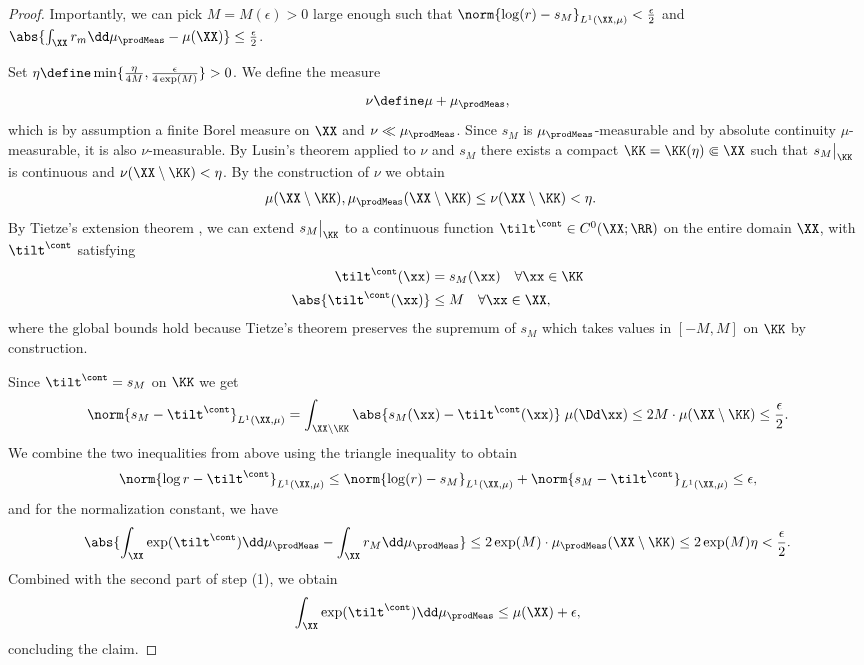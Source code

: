 \documentclass{article}
\begin{document}
\begin{proof}
 Importantly, we can pick $M = M(\epsilon) > 0$ large enough such that
 $\norm{\log(r) - s_{M}}_{L^1(\XX, \mu)} < \frac{\epsilon}{2}$ and
 $\abs{\int_{\XX} r_m \dd \mu_\prodMeas - \mu(\XX)} \leq
  \frac{\epsilon}{2}$.

 Set $\eta\define \min\{\frac{\eta}{4M}, \frac{\epsilon}{4\exp(M)}\} > 0$.
 We define the measure
 \begin{align*}
  \nu \define \mu + \mu_{\prodMeas},
 \end{align*}
 which is by assumption a finite Borel measure on $\XX$ and $\nu \ll \mu_\prodMeas$.
 Since $s_{M}$ is
 $\mu_\prodMeas$-measurable and by absolute continuity
 $\mu$-measurable, it is also $\nu$-measurable. By Lusin's theorem
 \cite[Thm. 1.14]{evansMeasureTheoryFine2015} applied to $\nu$ and $s_{M}$
 there exists a compact $\KK = \KK(\eta) \Subset \XX$ such that
 $s_{M}\big\vert_{\KK}$ is continuous
 and $\nu(\XX\setminus\KK) < \eta$. By the construction of
 $\nu$ we obtain
 \begin{align*}
  \mu(\XX\setminus\KK), \mu_\prodMeas(\XX\setminus\KK)
   & \leq \nu(\XX\setminus\KK)  < \eta.
 \end{align*}
 By Tietze's extension theorem
 \cite[Cor. 2]{mcshaneExtensionRangeFunctions1934}, we can extend
 $s_{ M}\big\vert_{\KK}$ to a continuous function $\tilt^\cont \in C^0(\XX;\RR)$
 on the entire domain $\XX$, with $\tilt^\cont$ satisfying
 \begin{align*}
  \tilt^\cont(\xx)       & = s_{ M}(\xx) \quad \forall \xx \in \KK \\
  \abs{\tilt^\cont(\xx)} & \leq M \quad \forall \xx \in \XX,
 \end{align*}
 where the global bounds hold because Tietze's theorem preserves the supremum of
 $s_{M}$ which takes values in $[-M, M]$ on $\KK$ by construction.


  Since $\tilt^\cont = s_{M}$ on $\KK$ we
 get
 \begin{align*}
  \norm{s_{ M} - \tilt^\cont}_{L^1(\XX, \mu)} =
  \int_{\XX\setminus\KK} \abs{s_M(\xx) - \tilt^\cont(\xx)} \; \mu(\Dd \xx)
  \leq 2M \cdot \mu(\XX\setminus \KK)
  \leq \frac{\epsilon}{2}.
 \end{align*}
 We combine the two inequalities from above using the triangle inequality to obtain
 \begin{align*}
  \norm{\log r - \tilt^\cont}_{L^1(\XX, \mu)}
  \leq \norm{\log(r) - s_{ M}}_{L^1(\XX, \mu)}
  + \norm{s_{ M} - \tilt^\cont}_{L^1(\XX, \mu)} \leq \epsilon,
 \end{align*}
 and for the normalization constant, we have
 \begin{align*}
  \abs{\int_{\XX} \exp(\tilt^\cont) \dd \mu_\prodMeas - \int_{\XX} r_M \dd \mu_\prodMeas}
  \leq 2 \exp(M) \cdot \mu_\prodMeas(\XX\setminus\KK)
  \leq 2 \exp(M) \eta < \frac{\epsilon}{2}.
 \end{align*}
 Combined with the second part of step (1), we obtain
 \begin{align*}
  \int_{\XX} \exp(\tilt^\cont) \dd \mu_\prodMeas \leq \mu(\XX) + \epsilon,
 \end{align*}
 concluding the claim.
\end{proof}
\end{document}
